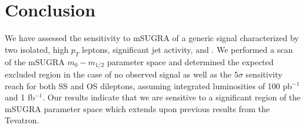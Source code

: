 \section{Conclusion}
\label{sec:conclusion}

We have assessed the sensitivity to mSUGRA of a generic signal characterized by two isolated, high $p_T$ leptons,
significant jet activity, and \met. We performed a scan of the mSUGRA $m_{0}-m_{1/2}$ parameter space and determined  
the expected excluded region in the case of no observed signal as well as the $5\sigma$ sensitivity reach for both SS
and OS dileptons, assuming integrated luminosities of 100 pb$^{-1}$ and 1 fb$^{-1}$. Our results indicate that we are sensitive to a
significant region of the mSUGRA parameter space which extends upon previous results from the Tevatron. 


